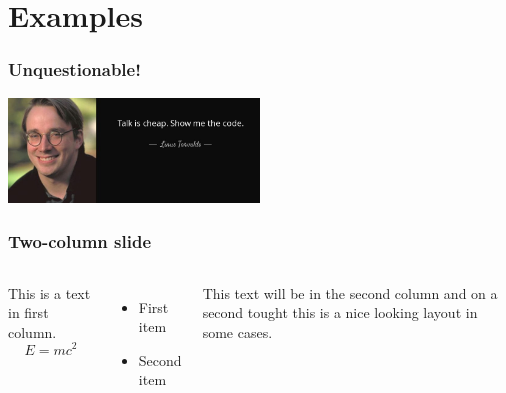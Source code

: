 \documentclass[aspectratio=169]{beamer}
\begin{document}
\section{Examples}

\begin{frame}
	\frametitle{Unquestionable!}

	\begin{center}
		\includegraphics[height=1\textheight,width=0.5\textwidth,keepaspectratio]{./images/show-me-the-code.jpg}
	\end{center}
\end{frame}

\begin{frame}
	\frametitle{Two-column slide}

	\begin{columns}

		This is a text in first column.
		$$E=mc^2$$
		\begin{itemize}
			\item First item
			\item Second item
		\end{itemize}

		This text will be in the second column
		and on a second tought this is a nice looking
		layout in some cases.
	\end{columns}
\end{frame}
\end{document}

